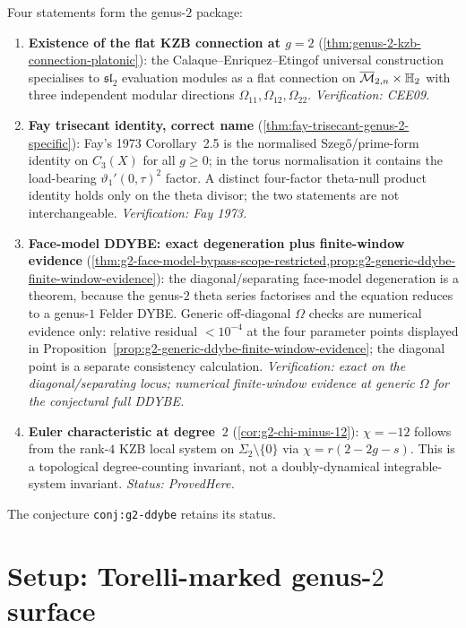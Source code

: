 Four statements form the genus-$2$ package:
\begin{enumerate}[label=\textup{(\arabic*)}]
\item \textbf{Existence of the flat KZB connection at $g=2$}
 (\cref{thm:genus-2-kzb-connection-platonic}): the
 Calaque--Enriquez--Etingof universal construction specialises
 to $\mathfrak{sl}_2$ evaluation modules as a flat connection
 on $\overline{\mathcal{M}}_{2,n}\times\mathbb{H}_2$ with three independent
 modular directions $\Omega_{11}, \Omega_{12}, \Omega_{22}$.
 \emph{Verification: CEE09.}
\item \textbf{Fay trisecant identity, correct name}
 (\cref{thm:fay-trisecant-genus-2-specific}): Fay's 1973
 Corollary~2.5 is the normalised Szeg\H{o}/prime-form
 identity on $C_3(X)$ for all $g\ge 0$; in the torus
 normalisation it contains the load-bearing
 $\vartheta_1'(0,\tau)^2$ factor. A distinct four-factor
 theta-null product identity holds only on the theta divisor;
 the two statements are not interchangeable.
 \emph{Verification: Fay 1973.}
\item \textbf{Face-model DDYBE: exact degeneration plus finite-window evidence}
 (\cref{thm:g2-face-model-bypass-scope-restricted,prop:g2-generic-ddybe-finite-window-evidence}):
 the diagonal/separating face-model degeneration is a theorem,
 because the genus-$2$ theta series factorises and the equation
 reduces to a genus-$1$ Felder DYBE. Generic off-diagonal
 $\Omega$ checks are numerical evidence only: relative residual
 $<10^{-4}$ at the four parameter points displayed in
 Proposition~\ref{prop:g2-generic-ddybe-finite-window-evidence};
 the diagonal point is a separate consistency calculation.
 \emph{Verification: exact on the diagonal/separating locus;
 numerical finite-window evidence at generic \(\Omega\) for the
 conjectural full DDYBE.}
\item \textbf{Euler characteristic at degree~$2$}
 (\cref{cor:g2-chi-minus-12}): $\chi=-12$ follows from the
 rank-$4$ KZB local system on $\Sigma_2\setminus\{0\}$ via
 $\chi=r(2-2g-s)$. This is a topological degree-counting
 invariant, not a doubly-dynamical integrable-system
 invariant.
 \emph{Status: ProvedHere.}
\end{enumerate}

The conjecture \texttt{conj:g2-ddybe} retains its
\texttt{\ClaimStatusConjectured} status.

\section{Setup: Torelli-marked genus-$2$ surface}
\label{sec:g2-ddybe-setup}

